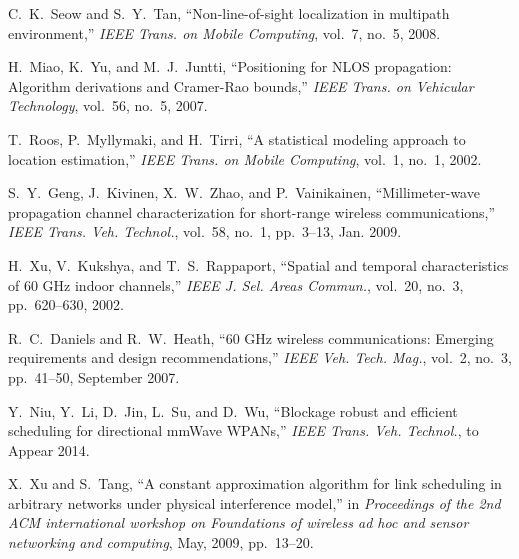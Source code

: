\documentclass[journal]{IEEEtran}
\begin{document}
\begin{thebibliography}{10}
C.~K.~Seow and S.~Y.~Tan, ``Non-line-of-sight localization in multipath environment,'' \emph{IEEE Trans. on Mobile Computing}, vol.~7, no.~5, 2008.

H.~Miao, K.~Yu, and M.~J.~Juntti, ``Positioning for NLOS propagation: Algorithm derivations and Cramer-Rao bounds,'' \emph{IEEE Trans. on Vehicular
Technology}, vol.~56, no.~5, 2007.

T.~Roos, P.~Myllymaki, and H.~Tirri, ``A statistical modeling approach to location estimation,'' \emph{IEEE Trans. on Mobile Computing}, vol.~1, no.~1, 2002.












 S.~Y.~Geng, J.~Kivinen, X.~W.~Zhao, and P.~Vainikainen,
``Millimeter-wave propagation channel characterization for
short-range wireless communications,'' \emph{IEEE Trans. Veh.
Technol.}, vol.~58, no.~1, pp.~3--13, Jan. 2009.

H.~Xu, V.~Kukshya, and T.~S.~Rappaport, ``Spatial and temporal characteristics of 60 GHz
indoor channels,'' \emph{IEEE J. Sel. Areas Commun.}, vol.~20, no.~3, pp.~620--630, 2002.

R.~C.~Daniels and R.~W.~Heath, ``60 GHz wireless communications: Emerging requirements
and design recommendations,'' \emph{IEEE Veh. Tech. Mag.}, vol.~2, no.~3, pp.~41--50, September 2007.


Y.~Niu, Y.~Li, D.~Jin, L.~Su, and D.~Wu, ``Blockage robust and efficient scheduling for directional
mmWave WPANs,'' \emph{IEEE Trans. Veh. Technol.}, to Appear 2014.



















 X.~Xu and S.~Tang, ``A constant approximation algorithm for link scheduling in arbitrary networks
under physical interference model,'' in \emph{Proceedings of the 2nd ACM international workshop on
Foundations of wireless ad hoc and sensor networking and computing}, May, 2009, pp.~13--20.



\end{thebibliography}
\end{document}
